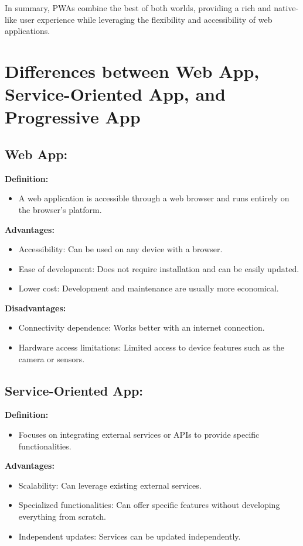 \documentclass{article}
\begin{document}
In summary, PWAs combine the best of both worlds, providing a rich and native-like user experience while leveraging the flexibility and accessibility of web applications.

\pagebreak
\section*{Differences between Web App, Service-Oriented App, and Progressive App}

\subsection*{Web App:}

\textbf{Definition:}
\begin{itemize}
  \item A web application is accessible through a web browser and runs entirely on the browser's platform.
\end{itemize}

\textbf{Advantages:}
\begin{itemize}
  \item Accessibility: Can be used on any device with a browser.
  \item Ease of development: Does not require installation and can be easily updated.
  \item Lower cost: Development and maintenance are usually more economical.
\end{itemize}

\textbf{Disadvantages:}
\begin{itemize}
  \item Connectivity dependence: Works better with an internet connection.
  \item Hardware access limitations: Limited access to device features such as the camera or sensors.
\end{itemize}

\subsection*{Service-Oriented App:}

\textbf{Definition:}
\begin{itemize}
  \item Focuses on integrating external services or APIs to provide specific functionalities.
\end{itemize}

\textbf{Advantages:}
\begin{itemize}
  \item Scalability: Can leverage existing external services.
  \item Specialized functionalities: Can offer specific features without developing everything from scratch.
  \item Independent updates: Services can be updated independently.
\end{itemize}
\end{document}
